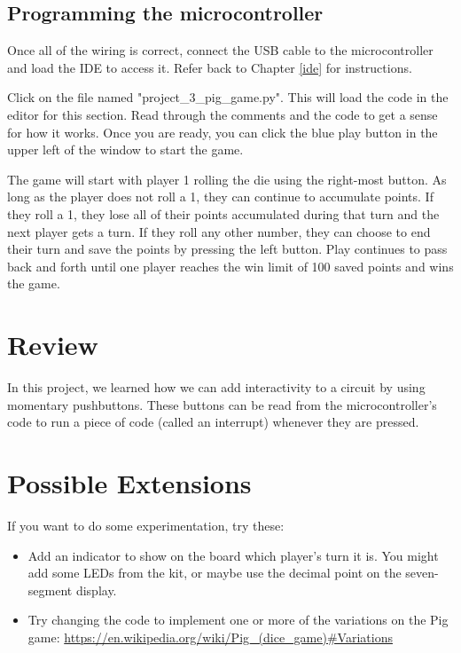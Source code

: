 \subsection{Programming the microcontroller}

Once all of the wiring is correct, connect the USB cable to the microcontroller and load the IDE to
access it. Refer back to Chapter \ref{ide} for instructions.

Click on the file named "project\_3\_pig\_game.py". This will load the code in the editor for this section.
Read through the comments and the code to get a sense for how it works. Once you are ready, you can
click the blue play button in the upper left of the window to start the game.

The game will start with player 1 rolling the die using the right-most button. As long as the player does not
roll a 1, they can continue to accumulate points. If they roll a 1, they lose all of their points accumulated
during that turn and the next player gets a turn. If they roll any other number, they can choose to end their
turn and save the points by pressing the left button. Play continues to pass back and forth until one player
reaches the win limit of 100 saved points and wins the game.

\section{Review}
In this project, we learned how we can add interactivity to a circuit by using momentary pushbuttons.
These buttons can be read from the microcontroller's code to run a piece of code (called an interrupt)
whenever they are pressed.

\section{Possible Extensions}
If you want to do some experimentation, try these:

\begin{itemize}
    \item Add an indicator to show on the board which player's turn it is. You might add some LEDs from the kit, or maybe use the decimal point on the seven-segment display.
    \item Try changing the code to implement one or more of the variations on the Pig game: \url{https://en.wikipedia.org/wiki/Pig_(dice_game)#Variations}
\end{itemize}

